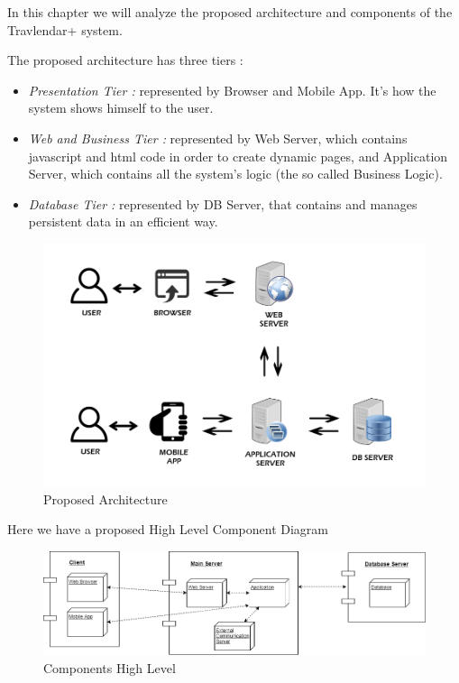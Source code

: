 \vspace*{-5mm}

In this chapter we will analyze the proposed architecture and components of the Travlendar+ system.\par
The proposed architecture has three tiers :
\begin{itemize}
	\setlength{\leftskip}{0.5cm}
	\item \emph{Presentation Tier : }represented by Browser and Mobile App. It's how the system shows himself to the user.
	\item \emph{Web and Business Tier : }represented by Web Server, which contains javascript and html code in order to create dynamic pages, and Application Server, which contains all the system's logic (the so called Business Logic).
	\item \emph{Database Tier : }represented by DB Server, that contains and manages persistent data in an efficient way.
\end{itemize}
\begin{figure}[H]
	\centering
	\includegraphics[scale=0.4]{Images/Architecture/Proposed_Architecture}
	\caption{Proposed Architecture}
\end{figure}

Here we have a proposed High Level Component Diagram
\begin{figure}[H]
	\centering
	\includegraphics[scale=0.4]{Images/Architecture/Components_High_Level}
	\caption{Components High Level}
\end{figure}

